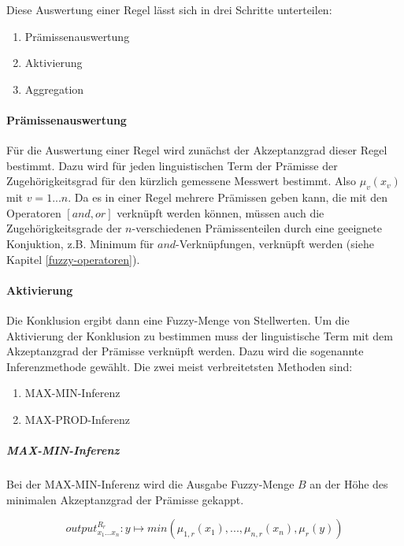 \documentclass[12pt,a4paper,bibliography=totocnumbered,listof=totocnumbered]{scrartcl}
\theoremstyle{Umgebung}
\begin{document}
Diese Auswertung einer Regel lässt sich in drei Schritte unterteilen:

\begin{enumerate} 
	\item Prämissenauswertung
	\item Aktivierung
	\item Aggregation
\end{enumerate}

\paragraph{Prämissenauswertung}

Für die Auswertung einer Regel wird zunächst der Akzeptanzgrad dieser Regel bestimmt. Dazu wird für jeden linguistischen Term der Prämisse der Zugehörigkeitsgrad für den kürzlich gemessene Messwert bestimmt. Also $\mu_v (x_v)$ mit $v = 1...n$. Da es in einer Regel mehrere Prämissen geben kann, die mit den Operatoren $\left[and, or\right]$ verknüpft werden können, müssen auch die Zugehörigkeitsgrade der $n$-verschiedenen Prämissenteilen durch eine geeignete Konjuktion, z.B. Minimum für $and$-Verknüpfungen, verknüpft werden (siehe Kapitel \ref{fuzzy-operatoren}).

\paragraph{Aktivierung}

Die Konklusion ergibt dann eine Fuzzy-Menge von Stellwerten. Um die Aktivierung der Konklusion zu bestimmen muss der linguistische Term mit dem Akzeptanzgrad der Prämisse verknüpft werden. Dazu wird die sogenannte Inferenzmethode gewählt. Die zwei meist verbreitetsten Methoden sind: 

\begin{enumerate} 
	\item MAX-MIN-Inferenz
	\item MAX-PROD-Inferenz
\end{enumerate}

\subparagraph{MAX-MIN-Inferenz}

Bei der MAX-MIN-Inferenz wird die Ausgabe Fuzzy-Menge $B$ an der Höhe des minimalen Akzeptanzgrad der Prämisse gekappt. 

\begin{equation}
	output^{R_r}_{x_1...x_n}:  y \mapsto min(\mu_{1,r}(x_1), ..., \mu_{n,r}(x_n), \mu_r(y))
\end{equation}
\end{document}
